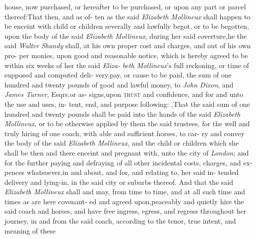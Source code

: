 \documentclass{article}
\begin{document}
\lqq house, now purchased, or hereafter to\break
\lqq be purchased, or upon any part or\break
\lqq parcel thereof:\tsk  That then, and as of-\break
\lqq ten as the said \textit{Elizabeth Mollineux} shall\break
\lqq happen to be enceint with child or\break
\lqq children severally and lawfully begot,\break
\lqq or to be begotten, upon the body of\break
\lqq the said \textit{Elizabeth Mollineux}, during her\break
\lqq said coverture,\tsk  he the said \textit{Walter}\break
\lqq \textit{Shandy} shall, at his own proper cost\break
\lqq and charges, and out of his own pro-\break
\lqq per monies, upon good and reasonable\break
\lqq notice, which is hereby agreed to be 
\lqq within six weeks of her the said \textit{Eliza-}\break
\lqq \textit{beth Mollineux}’s full reckoning, or\break
\lqq time of supposed and computed deli-\break
\lqq very,\tsk  pay, or cause to be paid, the\break
\lqq sum of one hundred and twenty pounds\break
\lqq of good and lawful money, to \textit{John}\break
\lqq \textit{Dixon}, and \textit{James Turner}, Esqrs.\@ or as-\break
\lqq signs,\tsk  upon \textsc{trust} and confidence,\break
\lqq and for and unto the use and uses, in-\break
\lqq tent, end, and purpose following:\tsk\break
\lqq {}\hbox{},\tsk  That the said sum\break
\lqq of one hundred and twenty pounds\break
\lqq shall be paid into the hands of the said\break
\lqq \textit{Elizabeth Mollineux}, or to be otherwise\break
\lqq applied by them the said trustees, for\break
\lqq the well and truly hiring of one coach,\break
\lqq with able and sufficient horses, to car-\break
\lqq ry and convey the body of the said\break
\lqq \textit{Elizabeth Mollineux}, and the child or\break
\lqq children which she shall be then and\break
\lqq there enceint and pregnant with,\tsk{}
\lqq unto the city of \textit{London}; and for the\break
\lqq further paying and defraying of all\break
\lqq other incidental costs, charges, and ex-\break
\lqq pences whatsoever,\tsk  in and about,\break
\lqq and for, and relating to, her said in-\break
\lqq tended delivery and lying-in, in the\break
\lqq said city or suburbs thereof. And that\break
\lqq the said \textit{Elizabeth Mollineux} shall and\break
\lqq may, from time to time, and at all such\break
\lqq time and times as are here covenant-\break
\lqq ed and agreed upon,\tsk  peaceably and\break
\lqq quietly hire the said coach and horses,\break
\lqq and have free ingress, egress, and\break
\lqq regress throughout her journey, in and\break
\lqq from the said coach, according to the\break
\lqq tenor, true intent, and meaning of these\break
\end{document}
